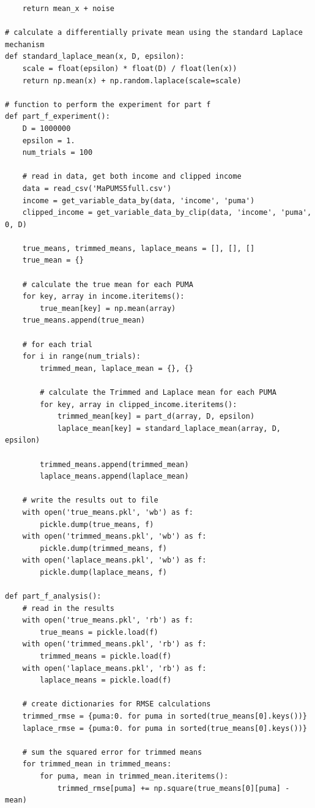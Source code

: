 \documentclass[12pt]{article}
\begin{document}
\begin{appendices}
\begin{lstlisting}
    return mean_x + noise

# calculate a differentially private mean using the standard Laplace mechanism
def standard_laplace_mean(x, D, epsilon):
    scale = float(epsilon) * float(D) / float(len(x))
    return np.mean(x) + np.random.laplace(scale=scale)

# function to perform the experiment for part f
def part_f_experiment():
    D = 1000000
    epsilon = 1.
    num_trials = 100

    # read in data, get both income and clipped income
    data = read_csv('MaPUMS5full.csv')
    income = get_variable_data_by(data, 'income', 'puma')
    clipped_income = get_variable_data_by_clip(data, 'income', 'puma', 0, D)

    true_means, trimmed_means, laplace_means = [], [], []
    true_mean = {}

    # calculate the true mean for each PUMA
    for key, array in income.iteritems():
        true_mean[key] = np.mean(array)
    true_means.append(true_mean)

    # for each trial
    for i in range(num_trials):
        trimmed_mean, laplace_mean = {}, {}

        # calculate the Trimmed and Laplace mean for each PUMA
        for key, array in clipped_income.iteritems():
            trimmed_mean[key] = part_d(array, D, epsilon)
            laplace_mean[key] = standard_laplace_mean(array, D, epsilon)

        trimmed_means.append(trimmed_mean)
        laplace_means.append(laplace_mean)

    # write the results out to file
    with open('true_means.pkl', 'wb') as f:
        pickle.dump(true_means, f)
    with open('trimmed_means.pkl', 'wb') as f:
        pickle.dump(trimmed_means, f)
    with open('laplace_means.pkl', 'wb') as f:
        pickle.dump(laplace_means, f)

def part_f_analysis():
    # read in the results
    with open('true_means.pkl', 'rb') as f:
        true_means = pickle.load(f)
    with open('trimmed_means.pkl', 'rb') as f:
        trimmed_means = pickle.load(f)
    with open('laplace_means.pkl', 'rb') as f:
        laplace_means = pickle.load(f)

    # create dictionaries for RMSE calculations
    trimmed_rmse = {puma:0. for puma in sorted(true_means[0].keys())}
    laplace_rmse = {puma:0. for puma in sorted(true_means[0].keys())}

    # sum the squared error for trimmed means
    for trimmed_mean in trimmed_means:
        for puma, mean in trimmed_mean.iteritems():
            trimmed_rmse[puma] += np.square(true_means[0][puma] - mean)


\end{lstlisting}
\end{appendices}
\end{document}
